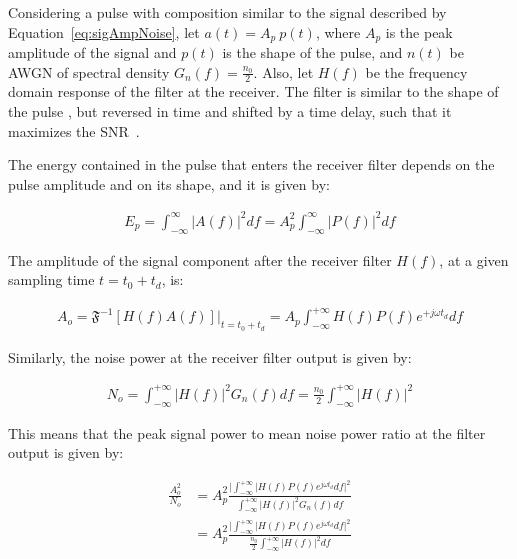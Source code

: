 \begin{refsection}
Considering a pulse with composition similar to the signal described by Equation~\ref{eq:sigAmpNoise}, let $ a(t) = A_p~p(t) $, where $A_p$ is the peak amplitude of the signal and $p(t)$ is the shape of the pulse, and $n(t)$ be AWGN of spectral density $G_n(f) = \frac{n_0}{2}$. Also, let $H(f)$ be the frequency domain response of the filter at the receiver.
The filter is similar to the shape of the pulse , but reversed in time and shifted by a time delay, such that it maximizes the SNR~\cite{carlson1986communication}.

The energy contained in the pulse that enters the receiver filter depends on the pulse amplitude and on its shape, and it is given by:

\begin{eqnarray}\label{eq:pulseEnergy}
E_p = \int_{-\infty}^{\infty} {|A(f)|}^2 df = A_p^2 \int_{-\infty}^{\infty} {|P(f)|}^2 df  
\end{eqnarray}

The amplitude of the signal component after the receiver filter $H(f)$, at a given sampling time $t=t_0+t_d$, is:

\begin{eqnarray}
A_o = \mathfrak{F}^{-1}\left[H(f) A(f)\right]\big|_{t=t_0+t_d} = A_p \int_{-\infty}^{+\infty} H(f) P(f) e^{+j \omega t_d}df
\end{eqnarray}

Similarly, the noise power at the receiver filter output is given by:

\begin{eqnarray}
N_o = \int_{-\infty}^{+\infty} {|H(f)|}^2 G_n(f) df = \frac{n_0}{2} \int_{-\infty}^{+\infty} {|H(f)|}^2
\end{eqnarray}

This means that the peak signal power to mean noise power ratio at the filter output is given by:

\begin{eqnarray}
\frac{A_o^2}{N_o} &= A_p^2 \frac{\big|\int_{-\infty}^{+\infty} |H(f) P(f)e^{j\omega t_d} df\big|^2}{\int_{-\infty}^{+\infty} {|H(f)|}^2 G_n(f) df}\\\nonumber
				  &= A_p^2 \frac{\big|\int_{-\infty}^{+\infty} |H(f) P(f)e^{j\omega t_d} df\big|^2}{\frac{n_0}{2}\int_{-\infty}^{+\infty} {|H(f)|}^2df}
\end{eqnarray}


\end{refsection}
